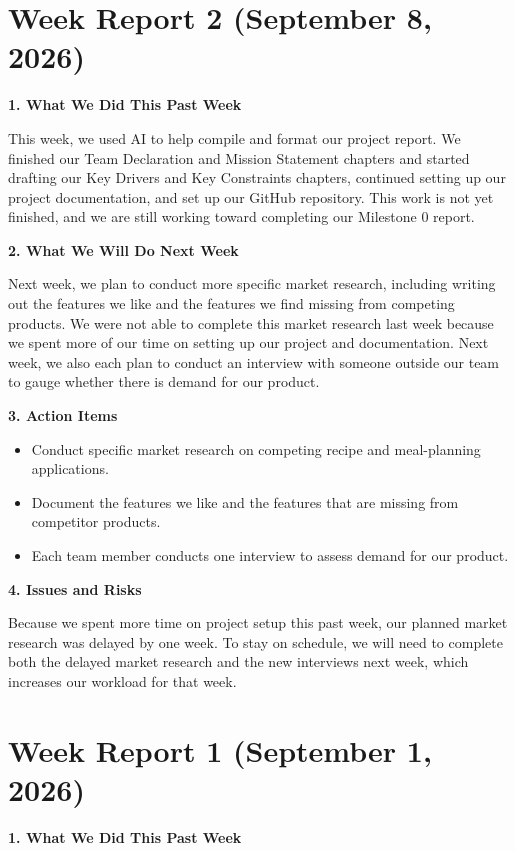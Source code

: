 \section{Week Report 2 (September 8, 2026)}

\noindent\textbf{1. What We Did This Past Week}

This week, we used AI to help compile and format our project report. We finished our Team Declaration and Mission Statement chapters and started drafting our Key Drivers and Key Constraints chapters, continued setting up our project documentation, and set up our GitHub repository. This work is not yet finished, and we are still working toward completing our Milestone 0 report.

\noindent\textbf{2. What We Will Do Next Week}

Next week, we plan to conduct more specific market research, including writing out the features we like and the features we find missing from competing products. We were not able to complete this market research last week because we spent more of our time on setting up our project and documentation. Next week, we also each plan to conduct an interview with someone outside our team to gauge whether there is demand for our product.

\noindent\textbf{3. Action Items}
\begin{itemize}
\item Conduct specific market research on competing recipe and meal-planning applications.
\item Document the features we like and the features that are missing from competitor products.
\item Each team member conducts one interview to assess demand for our product.
\end{itemize}

\noindent\textbf{4. Issues and Risks}

Because we spent more time on project setup this past week, our planned market research was delayed by one week. To stay on schedule, we will need to complete both the delayed market research and the new interviews next week, which increases our workload for that week.

\section{Week Report 1 (September 1, 2026)}

\noindent\textbf{1. What We Did This Past Week}

